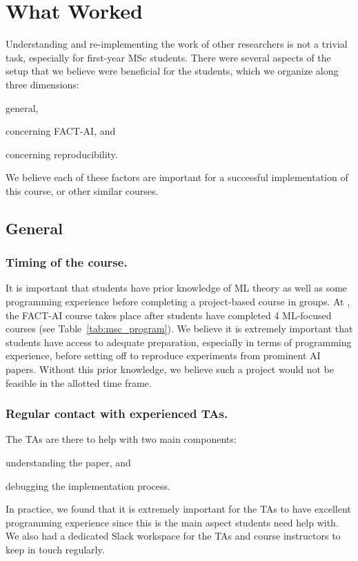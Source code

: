 
\section{What Worked}
\label{section:whatworked}

Understanding and re-implementing the work of other researchers is not a trivial task, especially for first-year MSc students. There were several aspects of the setup that we believe were beneficial for the students, which we organize along three dimensions: 
\begin{enumerate*}[label=(\roman*)]
    \item general, 
    \item concerning FACT-AI, and 
    \item concerning reproducibility.
\end{enumerate*}
We believe each of these factors are important for a successful implementation of this course, or other similar courses. 

\subsection{General}

\subsubsection{Timing of the course.}
It is important that students have prior knowledge of ML theory as well as some programming experience before completing a project-based course in groups. At \OurUniversity{}, the FACT-AI course takes place after students have completed 4 ML-focused courses (see Table~\ref{tab:msc_program}). 
We believe it is extremely important that students have access to adequate preparation, especially in terms of programming experience, before setting off to reproduce experiments from prominent AI papers. 
Without this prior knowledge, we believe such a project would not be feasible in the allotted time frame. 

\subsubsection{Regular contact with experienced TAs.}
The TAs are there to help with two main components: 
\begin{enumerate*}[label=(\roman*)]
\item understanding the paper, and 
\item debugging the implementation process. 
\end{enumerate*}
In practice, we found that it is extremely important for the TAs to have excellent programming experience since this is the main aspect students need help with. 
We also had a dedicated Slack workspace for the TAs and course instructors to keep in touch regularly. 

